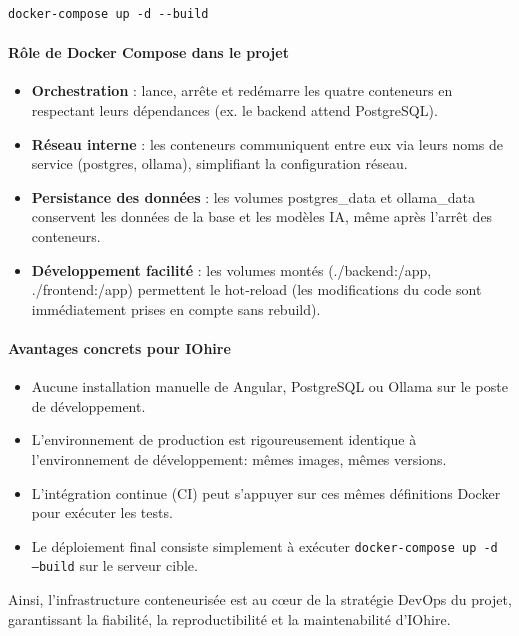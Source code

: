 \documentclass[12pt,a4paper,oneside]{report}
\begin{document}
\begin{itemize}
\begin{verbatim}
docker-compose up -d --build
\end{verbatim}

\paragraph{Rôle de Docker Compose dans le projet}
\begin{itemize}
    \item \textbf{Orchestration} : lance, arrête et redémarre les quatre conteneurs en respectant leurs dépendances (ex. le backend attend PostgreSQL).
    \item \textbf{Réseau interne} : les conteneurs communiquent entre eux via leurs noms de service (postgres, ollama), simplifiant la configuration réseau.
    \item \textbf{Persistance des données} : les volumes postgres\_data et ollama\_data conservent les données de la base et les modèles IA, même après l’arrêt des conteneurs.
    \item \textbf{Développement facilité} : les volumes montés (./backend:/app, ./frontend:/app) permettent le hot‑reload (les modifications du code sont immédiatement prises en compte sans rebuild).
\end{itemize}

\paragraph{Avantages concrets pour IOhire}
\begin{itemize}
    \item Aucune installation manuelle de Angular, PostgreSQL ou Ollama sur le poste de développement.
    \item L’environnement de production est rigoureusement identique à l’environnement de développement: mêmes images, mêmes versions.
    \item L’intégration continue (CI) peut s’appuyer sur ces mêmes définitions Docker pour exécuter les tests.
    \item Le déploiement final consiste simplement à exécuter \texttt{docker-compose up -d --build} sur le serveur cible.
\end{itemize}

Ainsi, l’infrastructure conteneurisée est au cœur de la stratégie DevOps du projet, garantissant la fiabilité, la reproductibilité et la maintenabilité d’IOhire.



\end{itemize}
\end{document}

